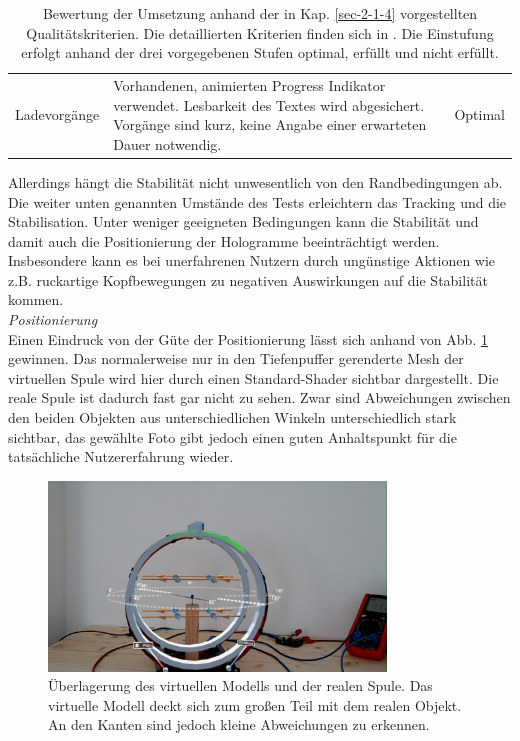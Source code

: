 \begin{landscape}
\begin{table}
\begin{tabular}{m{2.3cm}|m{15.5cm}|m{2cm}}
			\hline
			Ladevorgänge & Vorhandenen, animierten Progress Indikator verwendet. Lesbarkeit des Textes wird abgesichert. Vorgänge sind kurz, keine Angabe einer erwarteten Dauer notwendig. & Optimal\\
		\end{tabular}\caption{\label{tab:tech_results} Bewertung der Umsetzung anhand der in Kap. \ref{sec-2-1-4} vorgestellten Qualitätskriterien. Die detaillierten Kriterien finden sich in \cite{MRDoc}. Die Einstufung erfolgt anhand der drei vorgegebenen Stufen optimal, erfüllt und nicht erfüllt.}
	\end{table}
	\egroup
\end{landscape}

Allerdings hängt die Stabilität nicht unwesentlich von den Randbedingungen ab. Die weiter unten genannten Umstände des Tests erleichtern das Tracking und die Stabilisation. Unter weniger geeigneten Bedingungen kann die Stabilität und damit auch die Positionierung der Hologramme beeinträchtigt werden. Insbesondere kann es bei unerfahrenen Nutzern durch ungünstige Aktionen wie z.B. ruckartige Kopfbewegungen zu negativen Auswirkungen auf die Stabilität kommen.\\

\textit{Positionierung}\\
Einen Eindruck von der Güte der Positionierung lässt sich anhand von Abb. \ref{img:model-overlay} gewinnen. Das normalerweise nur in den Tiefenpuffer gerenderte Mesh der virtuellen Spule wird hier durch einen Standard-Shader sichtbar dargestellt. Die reale Spule ist dadurch fast gar nicht zu sehen. Zwar sind Abweichungen zwischen den beiden Objekten aus unterschiedlichen Winkeln unterschiedlich stark sichtbar, das gewählte Foto gibt jedoch einen guten Anhaltspunkt für die tatsächliche Nutzererfahrung wieder.\\

\begin{figure}[h!]
	\centering
	\includegraphics[width=0.8\textwidth]{images/HL/model-overlay.jpg}
	\caption{Überlagerung des virtuellen Modells und der realen Spule. Das virtuelle Modell deckt sich zum großen Teil mit dem realen Objekt. An den Kanten sind jedoch kleine Abweichungen zu erkennen.}
	\label{img:model-overlay}
\end{figure}

